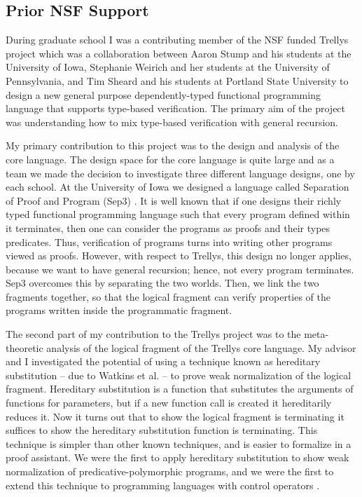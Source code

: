 \begin{full}
\section{Prior NSF Support}
\label{sec:prior_nsf_support}
During graduate school I was a contributing member of the NSF funded
Trellys project which was a collaboration between Aaron Stump and his
students at the University of Iowa, Stephanie Weirich and her students
at the University of Pennsylvania, and Tim Sheard and his students at
Portland State University to design a new general purpose
dependently-typed functional programming language that supports
type-based verification.  The primary aim of the project was
understanding how to mix type-based verification with general
recursion.

My primary contribution to this project was to the design and analysis
of the core language. The design space for the core language is quite
large and as a team we made the decision to investigate three
different language designs, one by each school. At the University of
Iowa we designed a language called Separation of Proof and Program
(Sep3)
\cite{Kimmel:2013,Kimmel:2012,Eades:2014b}. It is well known that if
one designs their richly typed functional programming language such
that every program defined within it terminates, then one can consider
the programs as proofs and their types predicates. Thus, verification
of programs turns into writing other programs viewed as
proofs. However, with respect to Trellys, this design no longer
applies, because we want to have general recursion; hence, not every
program terminates. Sep3 overcomes this by separating the two
worlds. Then, we link the two fragments together, so that the logical
fragment can verify properties of the programs written inside the
programmatic fragment.

The second part of my contribution to the Trellys project was to the
meta-theoretic analysis of the logical fragment of the Trellys core
language.  My advisor and I investigated the potential of using a
technique known as hereditary substitution -- due to Watkins et
al. \cite{Watkins:2004} -- to prove weak normalization of the logical
fragment.  Hereditary substitution is a function that substitutes the
arguments of functions for parameters, but if a new function call is
created it hereditarily reduces it. Now it turns out that to show the
logical fragment is terminating it suffices to show the hereditary
substitution function is terminating. This technique is simpler than
other known techniques, and is easier to formalize in a proof
assistant. We were the first to apply hereditary substitution to show
weak normalization of predicative-polymorphic programs, and we were
the first to extend this technique to programming languages with
control operators \cite{Eades:2010,Eades:2013,Eades:2014b}.


\end{full}
